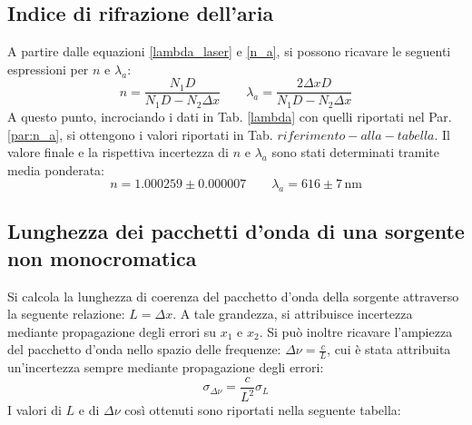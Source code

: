 \documentclass[]{article}
\let\oldsubsection\subsection%
\renewcommand{\subsection}{%
	\renewcommand{\theequation}{\thesubsection.\arabic{equation}}%
	\oldsubsection}%
\begin{document}
\subsection{Indice di rifrazione dell'aria}

A partire dalle equazioni \ref{lambda_laser} e \ref{n_a}, si possono ricavare le seguenti espressioni per $n$ e $\lambda_a$:
\begin{equation}
    \label{rifrazione}
    n = \frac{N_1 D}{N_1 D - N_2 \Delta x} \qquad
    \lambda_a = \frac{2\Delta x D}{N_1 D - N_2 \Delta x}
\end{equation}
A questo punto, incrociando i dati in Tab. \ref{lambda} con quelli riportati nel Par. \ref{par:n_a}, si ottengono i valori riportati in Tab. $riferimento-alla-tabella$. Il valore finale e la rispettiva incertezza di $n$ e $\lambda_a$ sono stati determinati tramite media ponderata:
\begin{equation}
    \label{n_a-lambda}
    n = 1.000259 \pm 0.000007 \qquad
    \lambda_a = 616 \pm 7 \, \text{nm}
\end{equation}

\subsection{Lunghezza dei pacchetti d'onda di una sorgente non monocromatica}
Si calcola la lunghezza di coerenza del pacchetto d'onda della sorgente attraverso la seguente relazione: $L=\Delta x$. A tale grandezza, si attribuisce incertezza mediante propagazione degli errori su $x_1$ e $x_2$. Si può inoltre ricavare l'ampiezza del pacchetto d'onda nello spazio delle frequenze: $\Delta \nu = \frac{c}{L}$, cui è stata attribuita un'incertezza sempre mediante propagazione degli errori:
\begin{equation}
    \label{sigma-nu}
    \sigma_{\Delta \nu} = \frac{c}{L^2} \sigma_L
\end{equation}
I valori di $L$ e di $\Delta \nu$ così ottenuti sono riportati nella seguente tabella:
\end{document}

